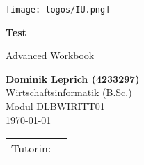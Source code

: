 \def\usesf{}
\let\usesf\sffamily %

\newsavebox{\Tutorin}


\setlength{\unitlength}{1pt}

\begin{titlepage}
\vspace{-39pt}\hspace*{300pt}\texttt{[image: logos/IU.png]}

\begin{center}
\hbox{}
\vfill
{\usesf}
{\huge\bfseries Test\par}
\vskip 1.8cm
Advanced Workbook\\[2mm]
\vskip 1cm

{\large\bfseries Dominik Leprich (4233297)\\}
\vskip 1.2cm
Wirtschaftsinformatik (B.Sc.)\\
Modul DLBWIRITT01\\
\today %
\vskip 3cm
\begin{tabular}{p{3cm}l}
Tutorin: & \usebox{\Tutorin} \\
\end{tabular}
\vfill
\end{center}

\end{titlepage}


